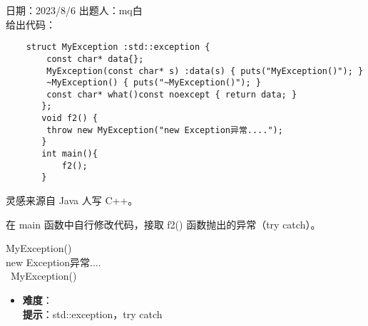 日期：2023/8/6 出题人：mq白\\

给出代码：

\begin{verbatim}
    struct MyException :std::exception {
        const char* data{};
        MyException(const char* s) :data(s) { puts("MyException()"); }
        ~MyException() { puts("~MyException()"); }
        const char* what()const noexcept { return data; }
       };
       void f2() {
        throw new MyException("new Exception异常....");
       }
       int main(){
           f2();
       }
\end{verbatim}

灵感来源自 Java 人写 C++。

在 main 函数中自行修改代码，接取 f2() 函数抛出的异常（try catch）。

\begin{tcolorbox}[title = {要求运行结果},
    fonttitle = \bfseries, fontupper = \sffamily, fontlower = \itshape]
    MyException()\\
    new Exception异常....\\
    ~MyException()
\end{tcolorbox}

\begin{itemize}
    \item \textbf{难度}：  \\
    \textbf{提示}：std::exception，try catch
\end{itemize}